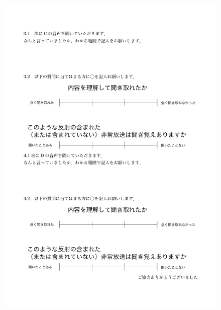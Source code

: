 \documentclass[a4j,11pt]{jsarticle}
\begin{document}
\begin{figure}[h]
\begin{center}
 \includegraphics[clip,width=180mm,height=240mm]{shitsumonshi3.pdf}
\end{center}
 \label{fig:kaitourei2}
\end{figure}
\end{document}
